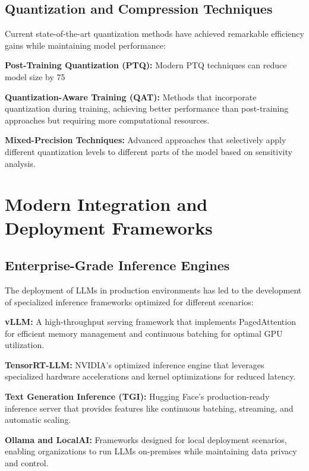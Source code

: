 \subsection{Quantization and Compression Techniques}

Current state-of-the-art quantization methods have achieved remarkable efficiency gains while maintaining model performance:

\textbf{Post-Training Quantization (PTQ):} Modern PTQ techniques can reduce model size by 75%

\textbf{Quantization-Aware Training (QAT):} Methods that incorporate quantization during training, achieving better performance than post-training approaches but requiring more computational resources.

\textbf{Mixed-Precision Techniques:} Advanced approaches that selectively apply different quantization levels to different parts of the model based on sensitivity analysis.

\section{Modern Integration and Deployment Frameworks}

\subsection{Enterprise-Grade Inference Engines}

The deployment of LLMs in production environments has led to the development of specialized inference frameworks optimized for different scenarios:

\textbf{vLLM:} A high-throughput serving framework that implements PagedAttention for efficient memory management and continuous batching for optimal GPU utilization.

\textbf{TensorRT-LLM:} NVIDIA's optimized inference engine that leverages specialized hardware accelerations and kernel optimizations for reduced latency.

\textbf{Text Generation Inference (TGI):} Hugging Face's production-ready inference server \cite{AnatomyOfTgi} that provides features like continuous batching, streaming, and automatic scaling.

\textbf{Ollama and LocalAI:} Frameworks designed for local deployment scenarios, enabling organizations to run LLMs on-premises while maintaining data privacy and control.

